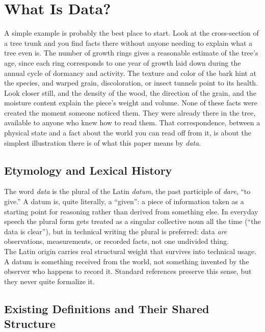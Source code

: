 \newpage

\section{What Is Data?}
\label{sec:what-is-data}

A simple example is probably the best place to start. Look at the
cross-section of a tree trunk and you find facts there without anyone needing
to explain what a tree even is. The number of growth rings gives a reasonable
estimate of the tree's age, since each ring corresponds to one year of growth
laid down during the annual cycle of dormancy and activity. The texture and
color of the bark hint at the species, and warped grain, discoloration, or
insect tunnels point to its health. Look closer still, and the density of the
wood, the direction of the grain, and the moisture content explain the piece's
weight and volume. None of these facts were created the moment someone noticed
them. They were already there in the tree, available to anyone who knew how to
read them. That correspondence, between a physical state and a fact about the
world you can read off from it, is about the simplest illustration there is of
what this paper means by \emph{data}.

\subsection{Etymology and Lexical History}

The word \emph{data} is the plural of the Latin \emph{datum}, the past
participle of \emph{dare}, ``to give.'' A datum is, quite literally, a
``given'': a piece of information taken as a starting point for reasoning
rather than derived from something else. In everyday speech the plural form
gets treated as a singular collective noun all the time (``the data is
clear''), but in technical writing the plural is preferred: data \emph{are}
observations, measurements, or recorded facts, not one undivided thing.\\
The Latin origin carries real structural weight that survives into technical
usage. A datum is something received from the world, not something invented
by the observer who happens to record it. Standard references preserve this
sense, but they never quite formalize it.
\newpage
\subsection{Existing Definitions and Their Shared Structure}

